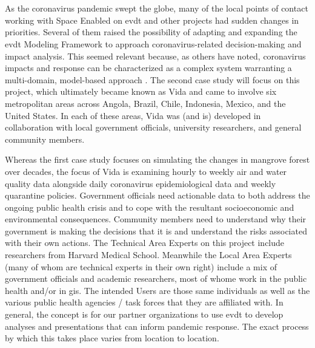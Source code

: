 \chapter{} \label{ch:vida}



\section{}

As the coronavirus pandemic swept the globe, many of the local points of contact working with Space Enabled on \ac{evdt} and other projects had sudden changes in priorities. Several of them raised the possibility of adapting and expanding the \ac{evdt} Modeling Framework to approach coronavirus-related decision-making and impact analysis. This seemed relevant because, as others have noted, coronavirus impacts and response can be characterized as a complex system warranting a multi-domain, model-based approach \cite{deweckHandlingCOVID192020}. The second case study will focus on this project, which ultimately became known as Vida and came to involve six metropolitan areas across Angola, Brazil, Chile, Indonesia, Mexico, and the United States. In each of these areas, Vida was (and is) developed in collaboration with local government officials, university researchers, and general community members. 

Whereas the first case study focuses on simulating the changes in mangrove forest over decades, the focus of Vida is examining hourly to weekly air and water quality data alongside daily coronavirus epidemiological data and weekly quarantine policies. Government officials need actionable data to both address the ongoing public health crisis and to cope with the resultant socioeconomic and environmental consequences. Community members need to understand why their government is making the decisions that it is and understand the risks associated with their own actions. \color{OliveGreen} The Technical Area Experts on this project include researchers from Harvard Medical School. Meanwhile the Local Area Experts (many of whom are technical experts in their own right) include a mix of government officials and academic researchers, most of whome work in the public health and/or in \ac{gis}. The intended Users are those same individuals as well as the various public health agencies / task forces that they are affiliated with.  In general, \color{black} the concept is for our partner organizations to use \ac{evdt} to develop analyses and presentations that can inform pandemic response. The exact process by which this takes place varies from location to location.

